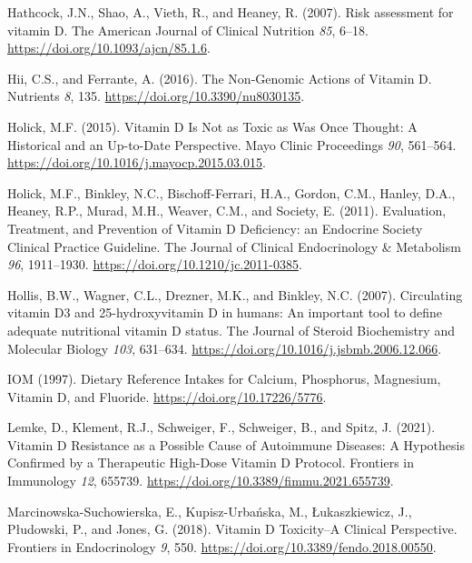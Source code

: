 \documentclass[
  letterpaper,
  DIV=11,
  numbers=noendperiod]{scrartcl}
\newlength{\cslhangindent}
\newlength{\cslentryspacingunit} %
\newenvironment{CSLReferences}[2] %
 {%
  \setlength{\parindent}{0pt}
  \ifodd #1
  \let\oldpar\par
  \def\par{\hangindent=\cslhangindent\oldpar}
  \fi
  \setlength{\parskip}{#2\cslentryspacingunit}
 }%
 {}
\begin{document}
\begin{CSLReferences}{0}{0}
\leavevmode{}%
Hathcock, J.N., Shao, A., Vieth, R., and Heaney, R. (2007). {Risk
assessment for vitamin D}. The American Journal of Clinical Nutrition
\emph{85}, 6--18. \url{https://doi.org/10.1093/ajcn/85.1.6}.

\leavevmode{}%
Hii, C.S., and Ferrante, A. (2016). {The Non-Genomic Actions of Vitamin
D}. Nutrients \emph{8}, 135. \url{https://doi.org/10.3390/nu8030135}.

\leavevmode{}%
Holick, M.F. (2015). {Vitamin D Is Not as Toxic as Was Once Thought: A
Historical and an Up-to-Date Perspective}. Mayo Clinic Proceedings
\emph{90}, 561--564. \url{https://doi.org/10.1016/j.mayocp.2015.03.015}.

\leavevmode{}%
Holick, M.F., Binkley, N.C., Bischoff-Ferrari, H.A., Gordon, C.M.,
Hanley, D.A., Heaney, R.P., Murad, M.H., Weaver, C.M., and Society, E.
(2011). {Evaluation, Treatment, and Prevention of Vitamin D Deficiency:
an Endocrine Society Clinical Practice Guideline}. The Journal of
Clinical Endocrinology \& Metabolism \emph{96}, 1911--1930.
\url{https://doi.org/10.1210/jc.2011-0385}.

\leavevmode{}%
Hollis, B.W., Wagner, C.L., Drezner, M.K., and Binkley, N.C. (2007).
{Circulating vitamin D3 and 25-hydroxyvitamin D in humans: An important
tool to define adequate nutritional vitamin D status}. The Journal of
Steroid Biochemistry and Molecular Biology \emph{103}, 631--634.
\url{https://doi.org/10.1016/j.jsbmb.2006.12.066}.

\leavevmode{}%
IOM (1997). {Dietary Reference Intakes for Calcium, Phosphorus,
Magnesium, Vitamin D, and Fluoride}.
\url{https://doi.org/10.17226/5776}.

\leavevmode{}%
Lemke, D., Klement, R.J., Schweiger, F., Schweiger, B., and Spitz, J.
(2021). {Vitamin D Resistance as a Possible Cause of Autoimmune
Diseases: A Hypothesis Confirmed by a Therapeutic High-Dose Vitamin D
Protocol}. Frontiers in Immunology \emph{12}, 655739.
\url{https://doi.org/10.3389/fimmu.2021.655739}.

\leavevmode{}%
Marcinowska-Suchowierska, E., Kupisz-Urbańska, M., Łukaszkiewicz, J.,
Płudowski, P., and Jones, G. (2018). {Vitamin D Toxicity--A Clinical
Perspective}. Frontiers in Endocrinology \emph{9}, 550.
\url{https://doi.org/10.3389/fendo.2018.00550}.


\end{CSLReferences}
\end{document}
